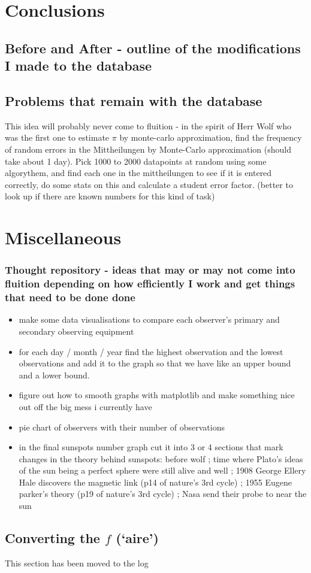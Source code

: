 \documentclass[12pt]{article}
\begin{document}
\section{Conclusions}

\subsection{Before and After - outline of the modifications I made to the database}

\subsection{Problems that remain with the database}

This idea will probably never come to fluition - in the spirit of Herr Wolf who was the first one to estimate $\pi$ by monte-carlo approximation, find the frequency of random errors in the Mittheilungen by Monte-Carlo approximation (should take about 1 day). Pick 1000 to 2000 datapoints at random using some algorythem, and find each one in the mittheilungen to see if it is entered correctly, do some stats on this and calculate a student error factor. (better to look up if there are known numbers for this kind of task)

\section{Miscellaneous}

\subsubsection{Thought repository - ideas that may or may not come into fluition depending on how efficiently I work and get things that need to be done done}
\begin{itemize}
    \item make some data visualisations to compare each observer's primary and secondary observing equipment
    \item for each day / month / year find the highest observation and the lowest observations and add it to the graph so that we have like an upper bound and a lower bound. 
    \item figure out how to smooth graphs with matplotlib and make something nice out off the big mess i currently have
    \item pie chart of observers with their number of observations
    \item in the final sunspots number graph cut it into 3 or 4 sections that mark changes in the theory behind sunspots: before wolf ; time where Plato's ideas of the sun being a perfect sphere were still alive and well ; 1908 George Ellery Hale discovers the magnetic link (p14 of nature's 3rd cycle) ; 1955 Eugene parker's theory (p19 of nature's 3rd cycle) ; Nasa send their probe to near the sun
\end{itemize}

\subsection{Converting the $f$ (`aire')}\label{converting the `aire'}
This section has been moved to the log
\end{document}
